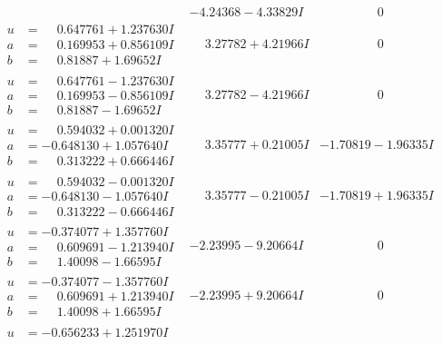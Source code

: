 \documentclass[1p]{elsarticle_modified}
\theoremstyle{definition}
\begin{document}
$$\begin{array}{c|c|c}
 & -4.24368 - 4.33829 I & \phantom{-0.000000 } 0 \\ \hline\begin{aligned}
u &= \phantom{-}0.647761 + 1.237630 I \\
a &= \phantom{-}0.169953 + 0.856109 I \\
b &= \phantom{-}0.81887 + 1.69652 I\end{aligned}
 & \phantom{-}3.27782 + 4.21966 I & \phantom{-0.000000 } 0 \\ \hline\begin{aligned}
u &= \phantom{-}0.647761 - 1.237630 I \\
a &= \phantom{-}0.169953 - 0.856109 I \\
b &= \phantom{-}0.81887 - 1.69652 I\end{aligned}
 & \phantom{-}3.27782 - 4.21966 I & \phantom{-0.000000 } 0 \\ \hline\begin{aligned}
u &= \phantom{-}0.594032 + 0.001320 I \\
a &= -0.648130 + 1.057640 I \\
b &= \phantom{-}0.313222 + 0.666446 I\end{aligned}
 & \phantom{-}3.35777 + 0.21005 I & -1.70819 - 1.96335 I \\ \hline\begin{aligned}
u &= \phantom{-}0.594032 - 0.001320 I \\
a &= -0.648130 - 1.057640 I \\
b &= \phantom{-}0.313222 - 0.666446 I\end{aligned}
 & \phantom{-}3.35777 - 0.21005 I & -1.70819 + 1.96335 I \\ \hline\begin{aligned}
u &= -0.374077 + 1.357760 I \\
a &= \phantom{-}0.609691 - 1.213940 I \\
b &= \phantom{-}1.40098 - 1.66595 I\end{aligned}
 & -2.23995 - 9.20664 I & \phantom{-0.000000 } 0 \\ \hline\begin{aligned}
u &= -0.374077 - 1.357760 I \\
a &= \phantom{-}0.609691 + 1.213940 I \\
b &= \phantom{-}1.40098 + 1.66595 I\end{aligned}
 & -2.23995 + 9.20664 I & \phantom{-0.000000 } 0 \\ \hline\begin{aligned}
u &= -0.656233 + 1.251970 I \\

\end{aligned}
\end{array}$$
\end{document}
